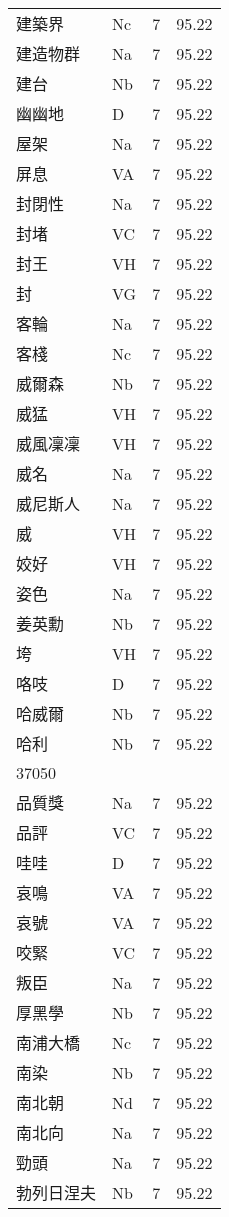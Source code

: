 \documentclass[twocolumn]{book}
\begin{document}
\begin{supertabular}{llrr}
建築界 & Nc & 7 &  95.22\\
建造物群 & Na & 7 &  95.22\\
建台 & Nb & 7 &  95.22\\
幽幽地 & D & 7 &  95.22\\
屋架 & Na & 7 &  95.22\\
屏息 & VA & 7 &  95.22\\
封閉性 & Na & 7 &  95.22\\
封堵 & VC & 7 &  95.22\\
封王 & VH & 7 &  95.22\\
封 & VG & 7 &  95.22\\
客輪 & Na & 7 &  95.22\\
客棧 & Nc & 7 &  95.22\\
威爾森 & Nb & 7 &  95.22\\
威猛 & VH & 7 &  95.22\\
威風凜凜 & VH & 7 &  95.22\\
威名 & Na & 7 &  95.22\\
威尼斯人 & Na & 7 &  95.22\\
威 & VH & 7 &  95.22\\
姣好 & VH & 7 &  95.22\\
姿色 & Na & 7 &  95.22\\
姜英勳 & Nb & 7 &  95.22\\
垮 & VH & 7 &  95.22\\
咯吱 & D & 7 &  95.22\\
哈威爾 & Nb & 7 &  95.22\\
哈利 & Nb & 7 &  95.22\\
37050\\
品質獎 & Na & 7 &  95.22\\
品評 & VC & 7 &  95.22\\
哇哇 & D & 7 &  95.22\\
哀鳴 & VA & 7 &  95.22\\
哀號 & VA & 7 &  95.22\\
咬緊 & VC & 7 &  95.22\\
叛臣 & Na & 7 &  95.22\\
厚黑學 & Nb & 7 &  95.22\\
南浦大橋 & Nc & 7 &  95.22\\
南染 & Nb & 7 &  95.22\\
南北朝 & Nd & 7 &  95.22\\
南北向 & Na & 7 &  95.22\\
勁頭 & Na & 7 &  95.22\\
勃列日涅夫 & Nb & 7 &  95.22\\

\end{supertabular}
\end{document}
